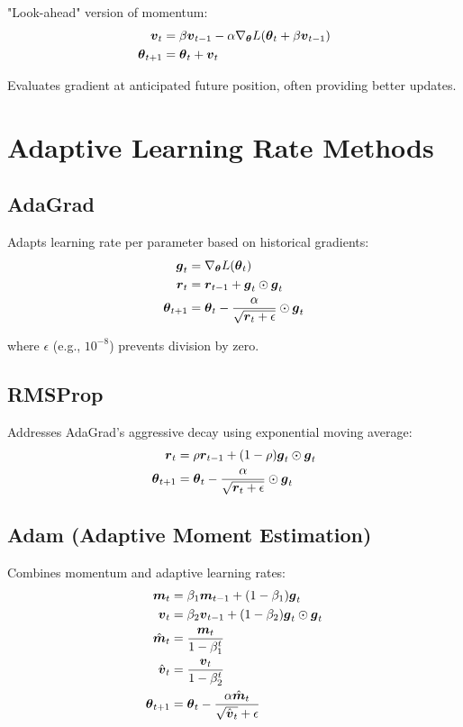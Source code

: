 "Look-ahead" version of momentum:
\begin{align}
\boldsymbol{v}_t &= \beta \boldsymbol{v}_{t-1} - \alpha \nabla_{\boldsymbol{\theta}} L(\boldsymbol{\theta}_t + \beta \boldsymbol{v}_{t-1}) \\
\boldsymbol{\theta}_{t+1} &= \boldsymbol{\theta}_t + \boldsymbol{v}_t
\end{align}

Evaluates gradient at anticipated future position, often providing better updates.

\section{Adaptive Learning Rate Methods}
\label{sec:adaptive-methods}

\subsection{AdaGrad}

Adapts learning rate per parameter based on historical gradients:
\begin{align}
\boldsymbol{g}_t &= \nabla_{\boldsymbol{\theta}} L(\boldsymbol{\theta}_t) \\
\boldsymbol{r}_t &= \boldsymbol{r}_{t-1} + \boldsymbol{g}_t \odot \boldsymbol{g}_t \\
\boldsymbol{\theta}_{t+1} &= \boldsymbol{\theta}_t - \frac{\alpha}{\sqrt{\boldsymbol{r}_t + \epsilon}} \odot \boldsymbol{g}_t
\end{align}

where $\epsilon$ (e.g., $10^{-8}$) prevents division by zero.

\subsection{RMSProp}

Addresses AdaGrad's aggressive decay using exponential moving average:
\begin{align}
\boldsymbol{r}_t &= \rho \boldsymbol{r}_{t-1} + (1-\rho) \boldsymbol{g}_t \odot \boldsymbol{g}_t \\
\boldsymbol{\theta}_{t+1} &= \boldsymbol{\theta}_t - \frac{\alpha}{\sqrt{\boldsymbol{r}_t + \epsilon}} \odot \boldsymbol{g}_t
\end{align}

\subsection{Adam (Adaptive Moment Estimation)}

Combines momentum and adaptive learning rates:
\begin{align}
\boldsymbol{m}_t &= \beta_1 \boldsymbol{m}_{t-1} + (1-\beta_1) \boldsymbol{g}_t \\
\boldsymbol{v}_t &= \beta_2 \boldsymbol{v}_{t-1} + (1-\beta_2) \boldsymbol{g}_t \odot \boldsymbol{g}_t \\
\hat{\boldsymbol{m}}_t &= \frac{\boldsymbol{m}_t}{1 - \beta_1^t} \\
\hat{\boldsymbol{v}}_t &= \frac{\boldsymbol{v}_t}{1 - \beta_2^t} \\
\boldsymbol{\theta}_{t+1} &= \boldsymbol{\theta}_t - \frac{\alpha \hat{\boldsymbol{m}}_t}{\sqrt{\hat{\boldsymbol{v}}_t} + \epsilon}
\end{align}

